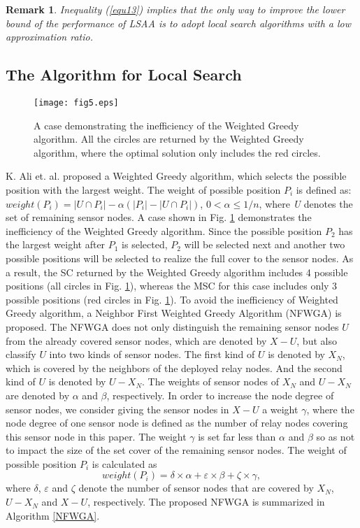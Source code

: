 \documentclass[journal]{IEEEtran}
\newtheorem{remark}{Remark}
\begin{document}
\begin{remark}
Inequality (\ref{equ13}) implies that the only way to improve the lower bound of the performance of LSAA is to adopt local search algorithms with a low approximation ratio.
\end{remark}
\subsection{The Algorithm for Local Search}

\begin{figure}
\begin{center}
\texttt{[image: fig5.eps]}    \caption{A case demonstrating the inefficiency of the Weighted Greedy algorithm. All the circles are returned by the Weighted Greedy algorithm, where the optimal solution only includes the red circles.}
\label{fig5}                                 \end{center}                                 \end{figure}

K. Ali et. al. \cite{Ali11} proposed a Weighted Greedy algorithm, which selects the possible position with the largest weight. The weight of possible position $P_i$ is defined as: $weight(P_i)=|U\cap P_i|-\alpha(|P_i|-|U\cap P_i|)$, $0<\alpha\leq 1/n$, where \emph{U} denotes the set of remaining sensor nodes. A case shown in Fig. \ref{fig5} demonstrates the inefficiency of the Weighted Greedy algorithm. Since the possible position $P_2$ has the largest weight after $P_1$ is selected, $P_2$ will be selected next and another two possible positions will be selected to realize the full cover to the sensor nodes. As a result, the SC returned by the Weighted Greedy algorithm includes 4 possible positions (all circles in Fig. \ref{fig5}), whereas the MSC for this case includes only 3 possible positions (red circles in Fig. \ref{fig5}). To avoid the inefficiency of Weighted Greedy algorithm, a Neighbor First Weighted Greedy Algorithm (NFWGA) is proposed.
The NFWGA does not only distinguish the remaining sensor nodes $U$ from the already covered sensor nodes, which are denoted by $X-U$, but also classify $U$ into two kinds of sensor nodes. The first kind of $U$ is denoted by $X_N$, which is covered by the neighbors of the deployed relay nodes. And the second kind of $U$ is denoted by $U-X_N$. The weights of sensor nodes of $X_N$ and $U-X_N$ are denoted by $\alpha$ and $\beta$, respectively. In order to increase the node degree of sensor nodes, we consider giving the sensor nodes in $X-U$ a weight $\gamma$, where the node degree of one sensor node is defined as the number of relay nodes covering this sensor node in this paper. The weight $\gamma$ is set far less than $\alpha$ and $\beta$ so as not to impact the size of the set cover of the remaining sensor nodes. The weight of possible position $P_i$ is calculated as
\begin{equation}\label{equ14}
    weight(P_i)=\delta\times \alpha+\varepsilon\times\beta+\zeta\times\gamma,
\end{equation}
where $\delta$, $\varepsilon$ and $\zeta$ denote the number of sensor nodes that are covered by $X_N$, $U-X_N$ and $X-U$, respectively. The proposed NFWGA is summarized in Algorithm \ref{NFWGA}.
\end{document}
